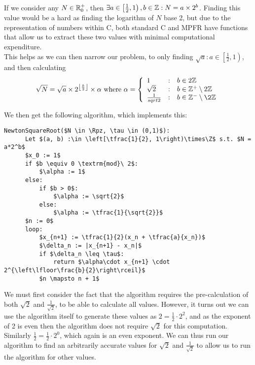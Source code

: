 \\

If we consider any \(N \in \mathbb{R}^+_0\), then \(\exists a \in \left[\frac{1}{2}, 1\right), b \in \mathbb{Z} : N = a \times 2^b\). Finding this value would be a hard as finding the logarithm of \(N\) base 2, but due to the representation of numbers within C, both standard C and MPFR have functions that allow us to extract these two values with minimal computational expenditure.\\

This helps as we can then narrow our problem, to only finding \(\sqrt{a} : a \in \left[\frac{1}{2}, 1\right)\), and then calculating 
\begin{displaymath}
	\sqrt{N} = \sqrt{a} \times 2^{\left\lfloor \frac{b}{2} \right\rfloor} \times \alpha \ \mathrm{where}\  
	\alpha = \left\{
		\begin{array}{lcl}
			1 & : & b \in 2\Z \\
			\sqrt{2} & : & b \in \Zp\setminus2\Z \\
			\frac{1}{sqrt{2}} & : & b \in \Zn\setminus\2\Z
		\end{array}\right.
\end{displaymath}

We then get the following algorithm, which implements this:

\begin{lstlisting}[frame=single,mathescape,caption={Newton Method for Square Root v3},label={PCD_"Newton Method for Square Root v3"}]
  NewtonSquareRoot($N \in \Rpz, \tau \in (0,1)$):
      Let $(a, b) :\in \left[\tfrac{1}{2}, 1\right)\times\Z$ s.t. $N = a*2^b$
      $x_0 := 1$
      if $b \equiv 0 \textrm{mod}\ 2$:
          $\alpha := 1$
      else:
          if $b > 0$:
              $\alpha := \sqrt{2}$
          else:
              $\alpha := \tfrac{1}{\sqrt{2}}$
      $n := 0$
      loop:
          $x_{n+1} := \tfrac{1}{2}(x_n + \tfrac{a}{x_n})$
          $\delta_n := |x_{n+1} - x_n|$
          if $\delta_n \leq \tau$:
              return $\alpha\cdot x_{n+1} \cdot 2^{\left\lfloor\frac{b}{2}\right\rceil}$
          $n \mapsto n + 1$
\end{lstlisting}

We must first consider the fact that the algorithm requires the pre-calculation of both \(\sqrt{2}\) and \(\tfrac{1}{\sqrt{2}}\), to be able to calculate all values. However, it turns out we can use the algorithm itself to generate these values as \(2 = \tfrac{1}{2} \cdot 2^2\), and as the exponent of 2 is even then the algorithm does not require \(\sqrt{2}\) for this computation. Similarly \(\tfrac{1}{2} = \tfrac{1}{2} \cdot 2^0\), which again is an even exponent. We can thus run our algorithm to find an arbitrarily accurate values for \(\sqrt{2}\) and \(\tfrac{1}{\sqrt{2}}\) to allow us to run the algorithm for other values.\\

